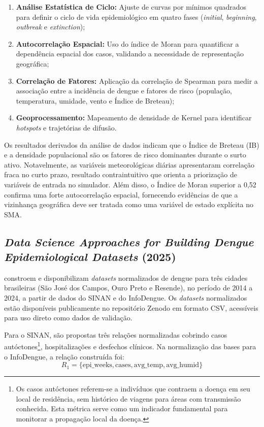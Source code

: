 \begin{apendicesenv}
\begin{enumerate}
    \item \textbf{Análise Estatística de Ciclo:} Ajuste de curvas por mínimos
    quadrados para definir o ciclo de vida epidemiológico em quatro fases
    (\textit{initial}, \textit{beginning}, \textit{outbreak} e \textit{extinction});
    \item \textbf{Autocorrelação Espacial:} Uso do índice de Moran para quantificar
    a dependência espacial dos casos, validando a necessidade de representação
    geográfica;
    \item \textbf{Correlação de Fatores:} Aplicação da correlação de Spearman para
    medir a associação entre a incidência de dengue e fatores de risco (população,
    temperatura, umidade, vento e Índice de Breteau);
    \item \textbf{Geoprocessamento:} Mapeamento de densidade de Kernel para
    identificar \textit{hotspots} e trajetórias de difusão.
\end{enumerate}

Os resultados derivados da análise de dados indicam que o Índice de Breteau (IB) e
a densidade populacional são os fatores de risco dominantes durante o surto ativo.
Notavelmente, as variáveis meteorológicas diárias apresentaram correlação fraca no
curto prazo, resultado contraintuitivo que orienta a priorização de variáveis de
entrada no simulador. Além disso, o Índice de Moran superior a 0,52 confirma uma
forte autocorrelação espacial, fornecendo evidências de que a vizinhança geográfica
deve ser tratada como uma variável de estado explícita no SMA.

\subsection{\textit{Data Science Approaches for Building Dengue Epidemiological
Datasets} (2025)}
\label{ap:moreira2025}

 constroem e disponibilizam \textit{datasets}
normalizados de dengue para três cidades brasileiras (São José dos Campos,
Ouro Preto e Resende), no período de 2014 a 2024, a partir de dados
do SINAN e do InfoDengue. Os \textit{datasets} normalizados estão disponíveis
publicamente no repositório Zenodo em formato CSV, acessíveis para uso direto
como dados de validação.

Para o SINAN, são propostas três relações normalizadas cobrindo casos
autóctones\footnote{Os casos autóctones referem-se a indivíduos que contraem a
doença em seu local de residência, sem histórico de viagens para áreas com
transmissão conhecida. Esta métrica serve como um indicador fundamental para
monitorar a propagação local da doença.}, hospitalizações e desfechos clínicos.
Na normalização das bases para o InfoDengue, a relação construída foi:
$$R_1 = \{\text{epi\_weeks}, \text{cases}, \text{avg\_temp}, \text{avg\_humid}\}$$


\end{apendicesenv}
